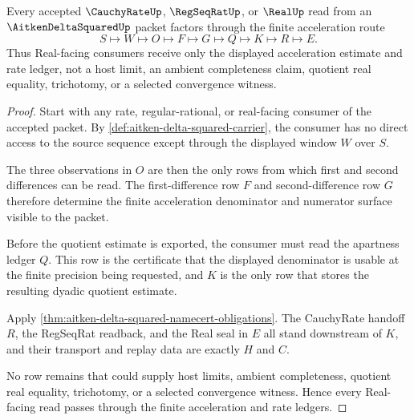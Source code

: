 \begin{theorem}
\label{thm:aitken-delta-squared-cauchy-rate-handoff}
Every accepted $\CauchyRateUp$, $\RegSeqRatUp$, or $\RealUp$ read from an $\AitkenDeltaSquaredUp$ packet factors through the finite acceleration route
$$
S\longmapsto W\longmapsto O\longmapsto F\longmapsto G\longmapsto Q\longmapsto K\longmapsto R\longmapsto E .
$$
Thus Real-facing consumers receive only the displayed acceleration estimate and rate ledger, not a host limit, an ambient completeness claim, quotient real equality, trichotomy, or a selected convergence witness.
\end{theorem}
\begin{proof}
Start with any rate, regular-rational, or real-facing consumer of the accepted packet. By \autoref{def:aitken-delta-squared-carrier}, the consumer has no direct access to the source sequence except through the displayed window $W$ over $S$.

The three observations in $O$ are then the only rows from which first and second differences can be read. The first-difference row $F$ and second-difference row $G$ therefore determine the finite acceleration denominator and numerator surface visible to the packet.

Before the quotient estimate is exported, the consumer must read the apartness ledger $Q$. This row is the certificate that the displayed denominator is usable at the finite precision being requested, and $K$ is the only row that stores the resulting dyadic quotient estimate.

Apply \autoref{thm:aitken-delta-squared-namecert-obligations}. The CauchyRate handoff $R$, the RegSeqRat readback, and the Real seal in $E$ all stand downstream of $K$, and their transport and replay data are exactly $H$ and $C$.

No row remains that could supply host limits, ambient completeness, quotient real equality, trichotomy, or a selected convergence witness. Hence every Real-facing read passes through the finite acceleration and rate ledgers.
\end{proof}


